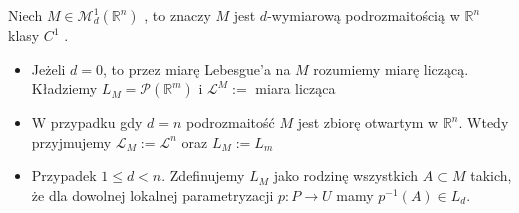 \begin{defi}
    Niech $M \in \mathcal{M}_d^1(\mathbb{R}^n)$ , to znaczy $M$ jest $d$-wymiarową podrozmaitością w $\mathbb{R}^n$ klasy $C^1$ .
    \begin{itemize}
    \item Jeżeli $d=0$, to przez miarę Lebesgue'a na $M$ rozumiemy miarę liczącą. Kładziemy $L_M = \mathcal{P}(\mathbb{R}^m)$  i $\mathcal{L}^M :=$ miara licząca
    \item W przypadku gdy $d=n$ podrozmaitość $M$ jest zbiorę otwartym w $\mathbb{R}^n$. Wtedy przyjmujemy $\mathcal{L}_M := \mathcal{L}^n$ oraz $L_M := L_m$ 
    \item Przypadek $1 \leq d < n$. Zdefinujemy $L_M$ jako rodzinę wszystkich $A \subset M$ takich, że dla dowolnej lokalnej parametryzacji $p : P \rightarrow U$ mamy $p^{-1}(A) \in L_d$. 
    \end{itemize}
\end{defi}